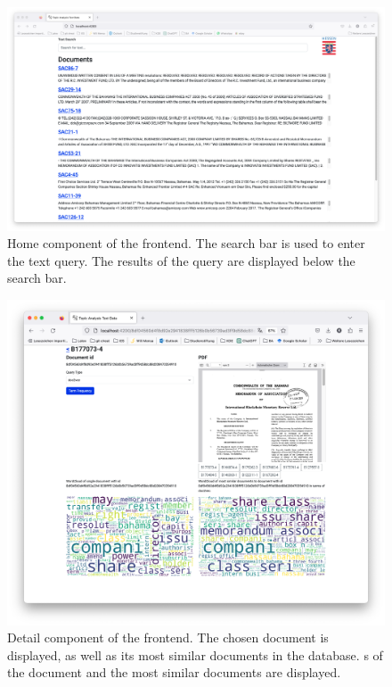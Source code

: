 \begin{figure}[!htb] %
    \centering
    \includegraphics[width=1\textwidth]{images/UI/Home_component.png}
    \caption[Home component of the frontend]{Home component of the frontend.
    The search bar is used to enter the text query.
    The results of the query are displayed below the search bar.
    }
    \label{fig:home_comp}
\end{figure}


\begin{figure}[!htb] %
    \centering
    \includegraphics[width=1\textwidth]{images/UI/Home_detail.png}
    \caption[Detail component of the frontend]{Detail component of the frontend.
    The chosen document is displayed, as well as its most similar documents in the database.
    \wordcloud{}s of the document and the most similar documents are displayed.
    }
    \label{fig:detail_comp}
\end{figure}


